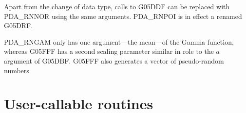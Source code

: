 \documentclass[11pt,twoside,nolof]{starlink}
\begin{document}
Apart from the change of data type, calls to G05DDF can be replaced
with PDA\_RNNOR using the same arguments.  PDA\_RNPOI is in effect a
renamed G05DRF.

PDA\_RNGAM only has one argument---the mean---of the Gamma function,
whereas G05FFF has a second scaling parameter similar in role to
the $a$ argument of G05DBF.  G05FFF also generates a vector of
pseudo-random numbers.



\appendix\newpage\small


\section{User-callable routines}



\end{document}
